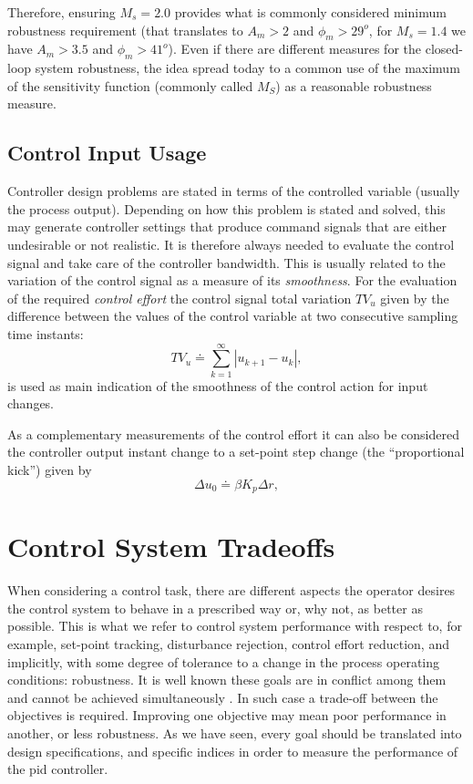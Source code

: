 Therefore, ensuring $M_s=2.0$ provides what is commonly considered minimum robustness requirement (that translates to $A_m> 2$ and $\phi_m > 29^o$, for $M_s=1.4$  we have $A_m > 3.5$ and $\phi_m > 41^o$). Even if there are different measures for the closed-loop system robustness, the idea spread today to a common use of the maximum of the sensitivity function (commonly called $M_S$) as a reasonable robustness measure.
%
%
\subsection{Control Input Usage}
%
Controller design problems are stated in terms of the controlled variable (usually the process output). Depending on how this problem is stated and solved, this may generate controller settings that produce command signals that are either undesirable or not realistic. It is therefore always needed to evaluate the control signal and take care of the controller bandwidth. This is usually related to the variation of the control signal as a measure of its \emph{smoothness}. For the evaluation of the required \emph{control effort} the control signal total variation $TV_u$ given by the difference between the values of the control variable at two consecutive sampling time instants:
%
\begin{equation}
	TV_u \doteq \sum^{\infty}_{k=1} \left|u_{k+1} - u_k \right|,  \label{eq:p02}
\end{equation}
%
is used as main indication of the smoothness of the control action for input changes.

As a complementary measurements of the control effort it can also be considered the controller output instant change to a set-point step change (the ``proportional kick'') given by
\begin{equation}
	\Delta u_0 \doteq \beta K_p \Delta r, \label{eq:p02du}
\end{equation}

\section{Control System Tradeoffs}
%
When considering a control task, there are different aspects the operator desires the control system to behave in a prescribed way or, why not, as better as possible. This is what we refer to control system performance with respect to, for example, set-point tracking, disturbance rejection, control effort reduction, and implicitly, with some degree of tolerance to a change in the process operating conditions: robustness. It is well known these goals are in conflict among them and cannot be achieved simultaneously \cite{Arrieta2010,alcantara2013} . In such case a trade-off between the objectives is required. Improving one objective may mean poor performance in another, or less robustness. As we have seen, every goal should be translated into design specifications, and specific indices in order to  measure the performance of the \gls{pid} controller.

